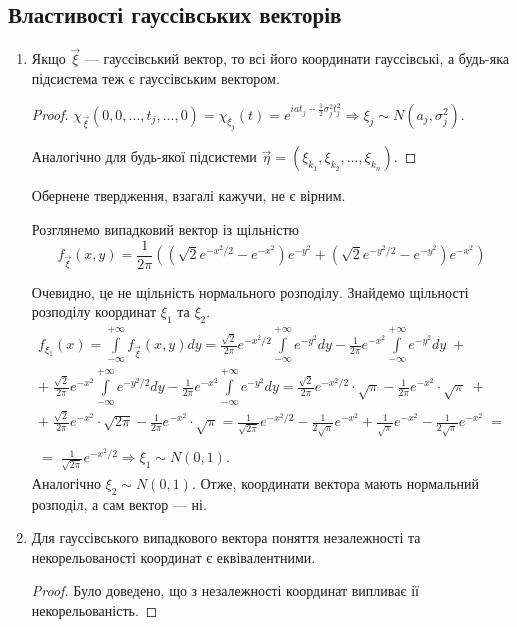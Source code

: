 \subsection{Властивості гауссівських векторів}
\begin{enumerate}
    \item Якщо $\vec{\xi}$ --- гауссівський вектор, то всі його координати гауссівські,
    а будь-яка підсистема теж є гауссівським вектором.
    \begin{proof}
        $\chi_{\vec{\xi}}(0,0,...,t_j, ..., 0) = \chi_{\xi_j}(t) = 
        e^{i a t_j - \frac{1}{2}\sigma_j^2 t_j^2} \Rightarrow \xi_j \sim {N}(a_j, \sigma_j^2)$.

        Аналогічно для будь-якої підсистеми $\vec{\eta} = (\xi_{k_1}, \xi_{k_2}, ..., \xi_{k_n})$.
    \end{proof}
    \begin{remark}
        Обернене твердження, взагалі кажучи, не є вірним.

        Розглянемо випадковий вектор із щільністю
        $$ f_{\vec{\xi}}(x, y) = \frac{1}{2\pi} \left( 
            \left( \sqrt{2} e^{-x^2/2} - e^{-x^2}\right)e^{-y^2} + 
            \left( \sqrt{2} e^{-y^2/2} - e^{-y^2}\right)e^{-x^2}\right)$$

        Очевидно, це не щільність нормального розподілу. Знайдемо щільності розподілу координат $\xi_1$ та $\xi_2$.
        \begin{gather*}
            f_{\xi_1}(x) = \int\limits_{-\infty}^{+\infty}f_{\vec{\xi}}(x, y) dy =
            \frac{\sqrt{2}}{2\pi} e^{-x^2/2}\int\limits_{-\infty}^{+\infty}e^{-y^2}dy -
            \frac{1}{2\pi}e^{-x^2}\int\limits_{-\infty}^{+\infty}e^{-y^2}dy \; +\\
            + \; \frac{\sqrt{2}}{2\pi}e^{-x^2}\int\limits_{-\infty}^{+\infty} e^{-y^2/2}dy - 
            \frac{1}{2\pi} e^{-x^2}\int\limits_{-\infty}^{+\infty}e^{-y^2}dy =
            \frac{\sqrt{2}}{2\pi} e^{-x^2/2}\cdot \sqrt{\pi} - \frac{1}{2\pi}e^{-x^2} \cdot \sqrt{\pi} \; + \\
            + \; \frac{\sqrt{2}}{2\pi}e^{-x^2} \cdot \sqrt{2\pi} - \frac{1}{2\pi}e^{-x^2}\cdot \sqrt{\pi} = 
            \frac{1}{\sqrt{2\pi}}e^{-x^2/2} - \frac{1}{2\sqrt{\pi}}e^{-x^2} + \frac{1}{\sqrt{\pi}}e^{-x^2} - \frac{1}{2\sqrt{\pi}}e^{-x^2} \; = \\ 
            \\ = \; \frac{1}{\sqrt{2\pi}}e^{-x^2/2} \Rightarrow \xi_1 \sim {N}(0, 1).
        \end{gather*}
        Аналогічно $\xi_2 \sim {N}(0, 1)$. Отже, координати вектора мають нормальний розподіл, а сам вектор --- ні.
    \end{remark}
    \item Для гауссівського випадкового вектора поняття незалежності та некорельованості координат є еквівалентними.
    \begin{proof}
        Було доведено, що з незалежності координат випливає ії некорельованість.


\end{proof}
\end{enumerate}

